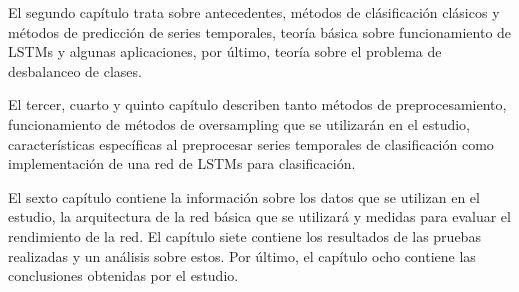 El segundo capítulo trata sobre antecedentes, métodos de clásificación clásicos y métodos de predicción de series temporales, teoría básica sobre funcionamiento de LSTMs y algunas aplicaciones, por último, teoría sobre el problema de desbalanceo de clases.\newline

El tercer, cuarto y quinto capítulo describen tanto métodos de preprocesamiento, funcionamiento de métodos de oversampling que se utilizarán en el estudio, características específicas al preprocesar series temporales de clasificación  como implementación de una red de LSTMs para clasificación.\newline

El sexto capítulo contiene la información sobre los datos que se utilizan en el estudio, la arquitectura de la red básica que se utilizará y medidas para evaluar el rendimiento de la red. El capítulo siete contiene los resultados de las pruebas realizadas y un análisis sobre estos. Por último, el capítulo ocho contiene las conclusiones obtenidas por el estudio.
